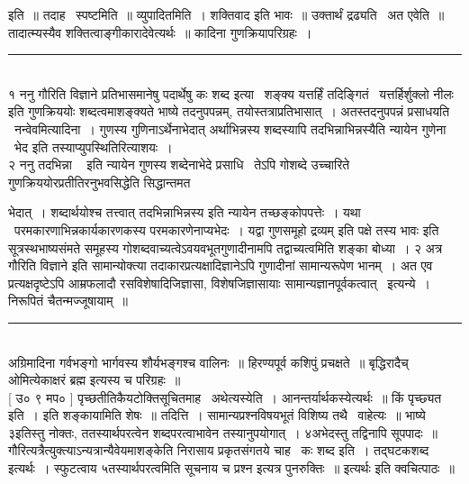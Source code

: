 \documentclass[11pt, openany]{book}
\begin{document}
\begin{multicols}{2}
इति~॥ तदाह \textendash\ स्पष्टमिति~॥ व्युपादितमिति~। शक्तिवाद इति भावः~॥ उक्तार्थं द्रढ्यति \textendash\ अत एवेति~॥ तादात्म्यस्यैव शक्तित्वाङ्गीकारादेवेत्यर्थः~॥ कादिना गुणक्रियापरिग्रहः~।

\noindent
\rule{1\linewidth}{0.5pt}\\

१ ननु गौरिति विज्ञाने प्रतिभासमानेषु पदार्थेषु कः शब्द इत्या \textendash\ शङ्क्य {\qt यत्तर्हिं तदिङ्गितं} \textendash\ यत्तर्हिर्शुक्लो नीलः इति गुणक्रिययोः शब्दत्वमाशङ्क्यते भाष्ये तदनुपपन्नम्, तयोस्तत्राप्रतिभासात्~। अतस्तदनुपपन्नं प्रसाधयति \textendash\ नन्वेवमित्यादिना~। गुणस्य गुणिनाऽर्थेनाभेदात् अर्थाभिन्नस्य शब्दस्यापि तदभिन्नाभिन्नस्यैति न्यायेन गुणेना \textendash\ भेद इति तस्याप्युपस्थितिरित्याशयः~।\\

२ ननु {\qt तदभिन्ना \textendash\ } इति न्यायेन गुणस्य शब्देनाभेदे प्रसाधि \textendash\ तेऽपि गोशब्दे उच्चारिते गुणक्रिययोरप्रतीतिरनुभवसिद्धेति सिद्धान्तमत \textendash\ 

\columnbreak

\noindent
भेदात्~। शब्दार्थयोश्च तत्त्वात् {\qt तदभिन्नाभिन्नस्य} इति न्यायेन तच्छङ्कोपपत्तेः~। यथा \textendash\ परमकारणाभिन्नकार्यकारणकस्य परमकारणेनाप्यभेदः~। यद्वा {\qt गुणसमूहो द्रव्यम्} इति पक्षे {\qt तस्य भावः} इति सूत्रस्थभाष्यसंमते समूहस्य गोशब्दवाच्यत्वेऽवयवभूतगुणादीनामपि तद्वाच्यत्वमिति शङ्का बोध्या~। २ अत्र {\qt गौरिति विज्ञाने} इति सामान्योक्त्या तदाकारप्रत्यक्षादिज्ञानेऽपि गुणादीनां सामान्यरूपेण भानम्~। अत एव प्रत्यक्षदृष्टेऽपि आम्रफलादौ रसविशेषादिजिज्ञासा, विशेषजिज्ञासायाः सामान्यज्ञानपूर्वकत्वात् \textendash\ इत्यन्ये~। निरूपितं चैतन्मज्जूषायाम्~॥

\noindent
\rule{1\linewidth}{0.5pt}\\

\noindent
अग्रिमादिना {\qt गर्वभङ्गो भार्गवस्य शौर्यभङ्गश्च} वालिनः~॥ हिरण्यपूर्व कशिपुं प्रचक्षते~॥ {\qt बृद्धिरादैच् ओमित्येकाक्षरं ब्रह्म} इत्यस्य च परिग्रहः~॥\\

 [ उ० ९ मप० ] पृच्छतीतिकैयटोक्तिसूचितमाह \textendash\ अथेत्यस्येति~। आनन्तर्यार्थकस्येत्यर्थः~॥ किं पृच्छ्यत इति~। इति शङ्कायामिति शेषः~॥ तदित्ति~। सामान्यप्रश्नविषयभूतं विशिष्य तथै \textendash\ वाहेत्यः~॥ भाष्ये ३इतिस्तु नोक्तः, ततस्यार्थपरत्वेन शब्दपरत्वाभावेन तस्यानुपयोगात्~। ४अभेदस्तु तद्विनापि सूपपादः~॥ गौरित्यत्रैत्युक्त्याऽन्यत्रान्यैवेयमाशङ्केति निरासाय प्रकृतसंगतये चाह \textendash\ कः शब्द इति~। तद्घटकशब्द इत्यर्थः~। स्फुटत्वाय ५तस्यार्थपरत्वमिति सूचनाय च प्रश्न इत्यत्र पुनरुक्तिः~॥ {\qt इत्यर्थः इति क्वचित्पाठः~॥}\\


\end{multicols}
\end{document}
